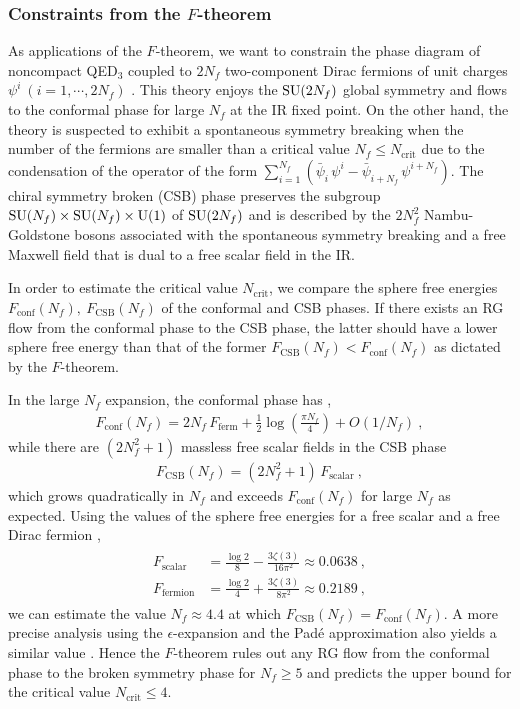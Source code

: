\subsubsection{Constraints from the $F$-theorem}

As applications of the $F$-theorem, we want to constrain the phase diagram of 
noncompact QED$_3$ coupled to $2N_f$ two-component Dirac fermions of unit charges $\psi^i~(i=1,\cdots, 2N_f)$ \cite{Grover:2012sp,Giombi:2015haa}.
This theory enjoys the $\mathrm{SU}(2N_f)$ global symmetry and flows to the conformal phase for large $N_f$ at the IR fixed point.
On the other hand, the theory is suspected to exhibit a spontaneous symmetry breaking when the number of the fermions are smaller than a critical value $N_f\le N_\text{crit}$ due to the condensation of the operator of the form $\sum_{i=1}^{N_f}(\bar\psi_i\,\psi^i - \bar\psi_{i+N_f}\,\psi^{i+N_f})$.
The chiral symmetry broken (CSB) phase preserves the subgroup $\mathrm{SU}(N_f)\times \mathrm{SU}(N_f) \times \mathrm{U}(1)$ of $\mathrm{SU}(2N_f)$ and is described by the $2N_f^2$ Nambu-Goldstone bosons associated with the spontaneous symmetry breaking and a free Maxwell field that is dual to a free scalar field in the IR.

In order to estimate the critical value $N_\text{crit}$, we compare the sphere free energies $F_\text{conf}(N_f),~F_\text{CSB}(N_f)$ of the conformal and CSB phases.
If there exists an RG flow from the conformal phase to the CSB phase, the latter should have a lower sphere free energy than that of the former $F_\text{CSB}(N_f) < F_\text{conf}(N_f)$ as dictated by the $F$-theorem.

In the large $N_f$ expansion, the conformal phase has \cite{Klebanov:2011td},
\begin{align}
	F_\text{conf}(N_f) = 2 N_f\, F_\text{ferm} + \frac{1}{2}\log \left( \frac{\pi N_f}{4}\right) + O(1/N_f) \ ,
\end{align} 
while there are $(2N_f^2 + 1)$ massless free scalar fields in the CSB phase
\begin{align}
	F_\text{CSB} (N_f) = \left(2N_f^2 + 1\right)\, F_\text{scalar} \ ,
\end{align}
which grows quadratically in $N_f$ and exceeds $F_\text{conf}(N_f)$ for large $N_f$ as expected.
Using the values of the sphere free energies for a free scalar and a free Dirac fermion \cite{Klebanov:2011gs,Dowker:2010yj},
\begin{align}\label{F_value_scalar}
\begin{aligned}
F_\text{scalar} &= \frac{\log 2}{8} - \frac{3\zeta (3)}{16\pi^2} \approx 0.0638 \ ,\\
F_\text{fermion} &= \frac{\log 2}{4} + \frac{3\zeta (3)}{8\pi^2} \approx 0.2189\ ,
\end{aligned}
\end{align}
we can estimate the value $N_f \approx 4.4$ at which $F_\text{CSB}(N_f)  = F_\text{conf}(N_f)$.
A more precise analysis using the $\epsilon$-expansion and the Pad{\'e} approximation also yields a similar value \cite{Giombi:2015haa}.
Hence the $F$-theorem rules out any RG flow from the conformal phase to the broken symmetry phase for $N_f \ge 5$ and predicts the upper bound for the critical value $N_\text{crit}\le 4$.


